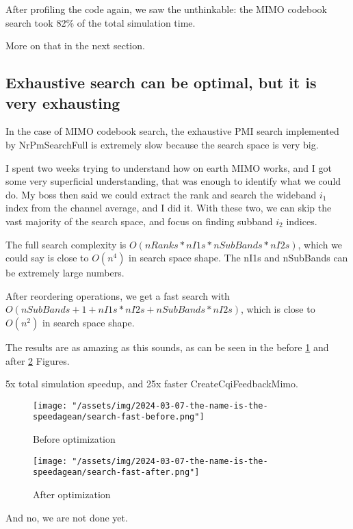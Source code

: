 \documentclass{article}
\begin{document}
After profiling the code again, we saw the unthinkable: the MIMO codebook search
took 82\% of the total simulation time.

More on that in the next section.

\subsection{Exhaustive search can be optimal, but it is very exhausting}

In the case of MIMO codebook search, the exhaustive PMI search implemented
by NrPmSearchFull is extremely slow because the search space is very big.

I spent two weeks trying to understand how on earth MIMO works, and I got
some very superficial understanding, that was enough to identify what we
could do. My boss then said we could extract the rank and search the
wideband $i_1$ index from the channel average, and I did it. With these
two, we can skip the vast majority of the search space, and focus on finding
subband $i_2$ indices.

The full search complexity is $O(nRanks*nI1s*nSubBands*nI2s)$,
which we could say is close to $O(n^4)$ in search space shape. The nI1s and nSubBands
can be extremely large numbers.

After reordering operations, we get a fast search with
$O(nSubBands+1+nI1s*nI2s+nSubBands*nI2s)$, which is close to
$O(n^2)$ in search space shape.

The results are as amazing as this sounds, as can be seen in the
before \ref{fig:search-fast-before} and after \ref{fig:search-fast-after} Figures.

5x total simulation speedup, and 25x faster CreateCqiFeedbackMimo.

\begin{figure}
    \texttt{[image: "/assets/img/2024-03-07-the-name-is-the-speedagean/search-fast-before.png"]}
    \caption{Before optimization}
    \label{fig:search-fast-before}
\end{figure}

\begin{figure}
    \texttt{[image: "/assets/img/2024-03-07-the-name-is-the-speedagean/search-fast-after.png"]}
    \caption{After optimization}
    \label{fig:search-fast-after}
\end{figure}

And no, we are not done yet.
\end{document}
